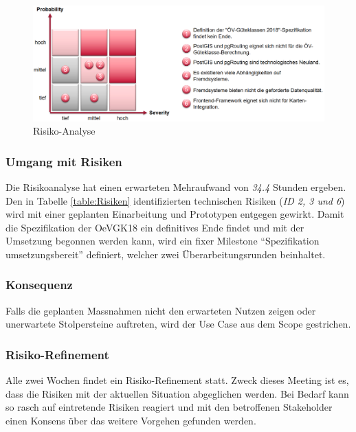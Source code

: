 \begin{figure}[ht]
    \centering
    \includegraphics[width=1.0\linewidth]{projectdoc/img/risk_analysis}
    \caption[Risiko-Analyse]{Risiko-Analyse}
    \label{fig:risk_analysis}
\end{figure}

\subsubsection{Umgang mit Risiken}
\label{Risiken:Umang mit Risiken}

Die Risikoanalyse hat einen erwarteten Mehraufwand von \emph{34.4} Stunden ergeben.
Den in Tabelle \ref{table:Risiken} identifizierten technischen Risiken (\emph{ID 2, 3 und 6}) wird mit einer geplanten Einarbeitung und Prototypen entgegen gewirkt.
Damit die Spezifikation der \gls{OeVGK18} ein definitives Ende findet und mit der Umsetzung begonnen werden kann, wird ein fixer Milestone "`Spezifikation umsetzungsbereit"' definiert, welcher zwei Überarbeitungsrunden beinhaltet.

\subsubsection{Konsequenz}
\label{Risiken:Konsequenz}

Falls die geplanten Massnahmen nicht den erwarteten Nutzen zeigen oder unerwartete Stolpersteine auftreten, wird der Use Case  aus dem Scope gestrichen.

\subsubsection{Risiko-Refinement}
\label{Risiken:Risiko-Refinement}

Alle zwei Wochen findet ein Risiko-Refinement statt.
Zweck dieses Meeting ist es, dass die Risiken mit der aktuellen Situation abgeglichen werden.
Bei Bedarf kann so rasch auf eintretende Risiken reagiert und mit den betroffenen Stakeholder einen Konsens über das weitere Vorgehen gefunden werden.
